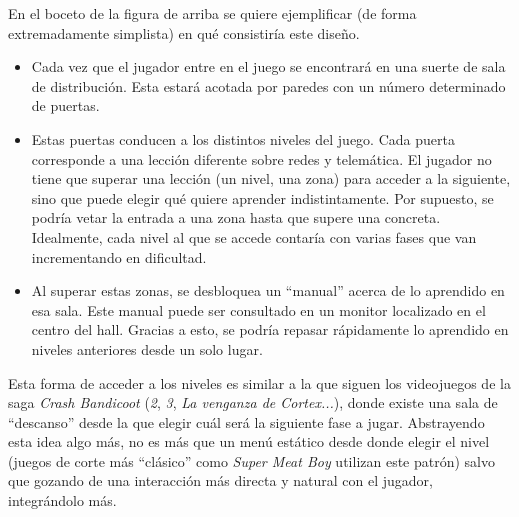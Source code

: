 En el boceto de la figura de arriba se quiere ejemplificar (de forma extremadamente simplista) en qué consistiría este diseño.
\begin{itemize}
\item Cada vez que el jugador entre en el juego se encontrará en una suerte de sala de distribución. Esta estará acotada por paredes con un número determinado de puertas.
\item Estas puertas conducen a los distintos niveles del juego. Cada puerta corresponde a una lección diferente sobre redes y telemática. El jugador no tiene que superar una lección (un nivel, una zona) para acceder a la siguiente, sino que puede elegir qué quiere aprender indistintamente. Por supuesto, se podría vetar la entrada a una zona hasta que supere una concreta. Idealmente, cada nivel al que se accede contaría con varias fases que van incrementando en dificultad.
\item Al superar estas zonas, se desbloquea un ``manual'' acerca de lo aprendido en esa sala. Este manual puede ser consultado en un monitor localizado en el centro del hall. Gracias a esto, se podría repasar rápidamente lo aprendido en niveles anteriores desde un solo lugar.
\end{itemize}
Esta forma de acceder a los niveles es similar a la que siguen los videojuegos de la saga \textit{Crash Bandicoot} (\textit{2}, \textit{3}, \textit{La venganza de Cortex...}), donde existe una sala de ``descanso'' desde la que elegir cuál será la siguiente fase a jugar. Abstrayendo esta idea algo más, no es más que un menú estático desde donde elegir el nivel (juegos de corte más ``clásico'' como \textit{Super Meat Boy} utilizan este patrón) salvo que gozando de una interacción más directa y natural con el jugador, integrándolo más.

